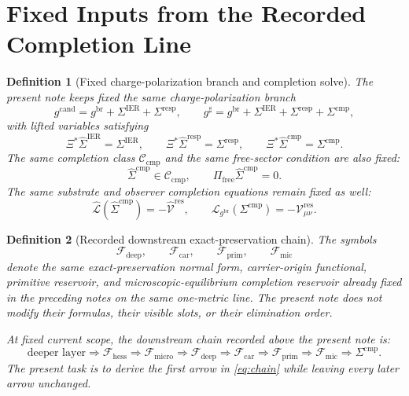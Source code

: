 \documentclass[11pt]{article}
\newcommand{\ObserverMap}{\Xi}
\newcommand{\ObserverMetric}{g^{\mathrm{br}}}
\newcommand{\CandidateMetric}{g^{\mathrm{cand}}}
\newcommand{\CompletedMetric}{g^{\sharp}}
\newcommand{\BaseShift}{\Sigma^{\mathrm{IER}}}
\newcommand{\ResponseShift}{\Sigma^{\mathrm{resp}}}
\newcommand{\CompShift}{\Sigma^{\mathrm{cmp}}}
\newcommand{\BaseLift}{\widehat\Sigma^{\mathrm{IER}}}
\newcommand{\ResponseLift}{\widehat\Sigma^{\mathrm{resp}}}
\newcommand{\CompLift}{\widehat\Sigma^{\mathrm{cmp}}}
\newcommand{\ResidualCore}{\mathcal V_{\mu\nu}^{\mathrm{res}}}
\newcommand{\ResidualLift}{\widehat{\mathcal V}^{\mathrm{res}}}
\newcommand{\SubReducedEin}{\widehat{\mathcal L}}
\newcommand{\FreeProj}{\Pi_{\mathrm{free}}}
\newcommand{\ReducedEin}{\mathcal L_{\ObserverMetric}}
\newcommand{\CompClass}{\mathscr C_{\mathrm{cmp}}}
\newcommand{\MicFunctional}{\mathscr F_{\mathrm{mic}}}
\newcommand{\PrimFunctional}{\mathscr F_{\mathrm{prim}}}
\newcommand{\CarrierFunctional}{\mathscr F_{\mathrm{car}}}
\newcommand{\DeepFunctional}{\mathscr F_{\mathrm{deep}}}
\newcommand{\UltraFunctional}{\mathscr F_{\mathrm{micro}}}
\newcommand{\RootFunctional}{\mathscr F_{\mathrm{hess}}}
\newtheorem{definition}{Definition}
\begin{document}
\section{Fixed Inputs from the Recorded Completion Line}

\begin{definition}[Fixed charge-polarization branch and completion solve]
\label{def:fixed_branch}
The present note keeps fixed the same charge-polarization branch
\begin{equation}
\CandidateMetric
=
\ObserverMetric+\BaseShift+\ResponseShift,
\qquad
\CompletedMetric
=
\ObserverMetric+\BaseShift+\ResponseShift+\CompShift,
\label{eq:fixed_metrics}
\end{equation}
with lifted variables satisfying
\begin{equation}
\ObserverMap^*\BaseLift=\BaseShift,
\qquad
\ObserverMap^*\ResponseLift=\ResponseShift,
\qquad
\ObserverMap^*\CompLift=\CompShift.
\label{eq:fixed_lifts}
\end{equation}
The same completion class \(\CompClass\) and the same free-sector condition are also fixed:
\begin{equation}
\CompLift\in \CompClass,
\qquad
\FreeProj \CompLift=0.
\label{eq:free_condition}
\end{equation}
The same substrate and observer completion equations remain fixed as well:
\begin{equation}
\SubReducedEin(\CompLift)=-\ResidualLift,
\qquad
\ReducedEin(\CompShift)=-\ResidualCore.
\label{eq:fixed_solves}
\end{equation}
\end{definition}

\begin{definition}[Recorded downstream exact-preservation chain]
\label{def:downstream_chain}
The symbols
\[
\DeepFunctional,\qquad
\CarrierFunctional,\qquad
\PrimFunctional,\qquad
\MicFunctional
\]
denote the same exact-preservation normal form, carrier-origin functional, primitive reservoir, and microscopic-equilibrium completion reservoir already fixed in the preceding notes on the same one-metric line. The present note does not modify their formulas, their visible slots, or their elimination order.

At fixed current scope, the downstream chain recorded above the present note is:
\begin{equation}
\text{deeper layer}
\Longrightarrow
\RootFunctional
\Longrightarrow
\UltraFunctional
\Longrightarrow
\DeepFunctional
\Longrightarrow
\CarrierFunctional
\Longrightarrow
\PrimFunctional
\Longrightarrow
\MicFunctional
\Longrightarrow
\Sigma^{\mathrm{cmp}}.
\label{eq:chain}
\end{equation}
The present task is to derive the first arrow in \eqref{eq:chain} while leaving every later arrow unchanged.
\end{definition}
\end{document}
